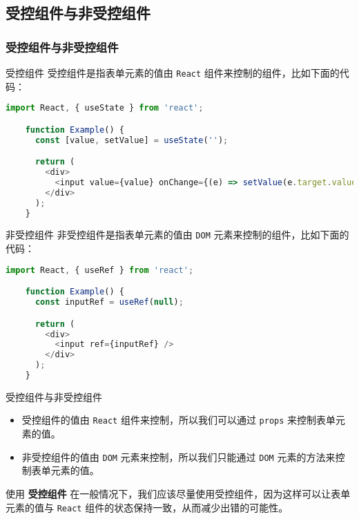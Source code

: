 \documentclass{beamer}
\begin{document}
\subsection{受控组件与非受控组件}
\begin{frame}
  \frametitle{受控组件与非受控组件}

  \begin{block}{受控组件}
    受控组件是指表单元素的值由 \texttt{React} 组件来控制的组件，比如下面的代码：
    \begin{lstlisting}[language=JavaScript]
    import React, { useState } from 'react';

    function Example() {
      const [value, setValue] = useState('');

      return (
        <div>
          <input value={value} onChange={(e) => setValue(e.target.value)} />
        </div>
      );
    }
  \end{lstlisting}
  \end{block}

  \framebreak

  \begin{block}{非受控组件}
    非受控组件是指表单元素的值由 \texttt{DOM} 元素来控制的组件，比如下面的代码：
    \begin{lstlisting}[language=JavaScript]
    import React, { useRef } from 'react';

    function Example() {
      const inputRef = useRef(null);

      return (
        <div>
          <input ref={inputRef} />
        </div>
      );
    }
  \end{lstlisting}
  \end{block}

  \framebreak

  \begin{alertblock}{受控组件与非受控组件}
    \begin{itemize}
      \item 受控组件的值由 \texttt{React} 组件来控制，所以我们可以通过 \texttt{props} 来控制表单元素的值。
      \item 非受控组件的值由 \texttt{DOM} 元素来控制，所以我们只能通过 \texttt{DOM} 元素的方法来控制表单元素的值。
    \end{itemize}
  \end{alertblock}

  \begin{block}{使用 \bf{受控组件}}
    在一般情况下，我们应该尽量使用受控组件，因为这样可以让表单元素的值与 \texttt{React} 组件的状态保持一致，从而减少出错的可能性。
  \end{block}

\end{frame}
\end{document}
